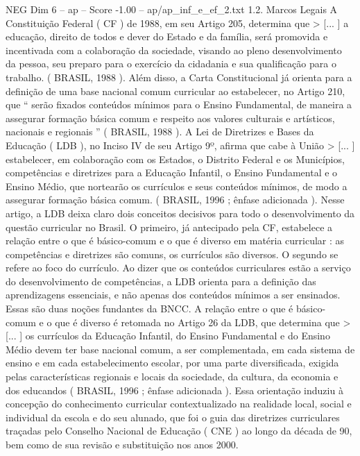 \begin{textsample}{NEG Dim 6 – ap – Score -1.00 – ap/ap\_inf\_e\_ef\_2.txt}  \label{ex:f6_neg_181}
1.2.
Marcos Legais A Constituição Federal ( CF ) de 1988, em seu Artigo 205, determina que > [... ] a educação, direito de todos e dever do Estado e da família, será promovida e incentivada com a colaboração da sociedade, visando ao pleno desenvolvimento da pessoa, seu preparo para o exercício da cidadania e sua qualificação para o trabalho. ( BRASIL, 1988 ).
Além disso, a Carta Constitucional já orienta para a definição de uma base nacional comum curricular ao estabelecer, no Artigo 210, que “ serão fixados conteúdos mínimos para o Ensino Fundamental, de maneira a assegurar formação básica comum e respeito aos valores culturais e artísticos, nacionais e regionais ” ( BRASIL, 1988 ).
A Lei de Diretrizes e Bases da Educação ( LDB ), no Inciso IV de seu Artigo 9º, afirma que cabe à União > [... ] estabelecer, em colaboração com os Estados, o Distrito Federal e os Municípios, competências e diretrizes para a Educação Infantil, o Ensino Fundamental e o Ensino Médio, que nortearão os currículos e seus conteúdos mínimos, de modo a assegurar formação básica comum. ( BRASIL, 1996 ; ênfase adicionada ).
Nesse artigo, a LDB deixa claro dois conceitos decisivos para todo o desenvolvimento da questão curricular no Brasil.
O primeiro, já antecipado pela CF, estabelece a relação entre o que é básico-comum e o que é diverso em matéria curricular : as competências e diretrizes são comuns, os currículos são diversos.
O segundo se refere ao foco do currículo.
Ao dizer que os conteúdos curriculares estão a serviço do desenvolvimento de competências, a LDB orienta para a definição das aprendizagens essenciais, e não apenas dos conteúdos mínimos a ser ensinados.
Essas são duas noções fundantes da BNCC.
A relação entre o que é básico-comum e o que é diverso é retomada no Artigo 26 da LDB, que determina que > [... ] os currículos da Educação Infantil, do Ensino Fundamental e do Ensino Médio devem ter base nacional comum, a ser complementada, em cada sistema de ensino e em cada estabelecimento escolar, por uma parte diversificada, exigida pelas características regionais e locais da sociedade, da cultura, da economia e dos educandos ( BRASIL, 1996 ; ênfase adicionada ).
Essa orientação induziu à concepção do conhecimento curricular contextualizado na realidade local, social e individual da escola e do seu alunado, que foi o guia das diretrizes curriculares traçadas pelo Conselho Nacional de Educação ( CNE ) ao longo da década de 90, bem como de sua revisão e substituição nos anos 2000.

\end{textsample}
